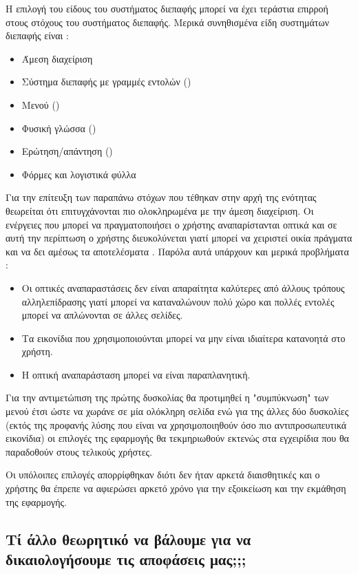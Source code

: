 \documentclass{assignment}
\begin{document}
Η επιλογή του είδους του συστήματος διεπαφής μπορεί να έχει τεράστια επιρροή στους στόχους του συστήματος διεπαφής. Μερικά συνηθισμένα είδη συστημάτων διεπαφής είναι \cite{class_notes}:

\begin{itemize}
\item Άμεση διαχείριση
\item Σύστημα διεπαφής με γραμμές εντολών ()
\item Μενού ()
\item Φυσική γλώσσα ()
\item Ερώτηση/απάντηση ()
\item Φόρμες και λογιστικά φύλλα
\end{itemize}

Για την επίτευξη των παραπάνω στόχων που τέθηκαν στην αρχή της ενότητας θεωρείται ότι επιτυγχάνονται πιο ολοκληρωμένα με την άμεση διαχείριση. Οι ενέργειες που μπορεί να πραγματοποιήσει ο χρήστης αναπαρίστανται οπτικά και σε αυτή την περίπτωση ο χρήστης διευκολύνεται γιατί μπορεί να χειριστεί οικία πράγματα και να δει αμέσως τα αποτελέσματα \cite{class_notes}. Παρόλα αυτά υπάρχουν και μερικά προβλήματα \cite{class_notes}:

\begin{itemize}
\item Οι οπτικές αναπαραστάσεις δεν είναι απαραίτητα καλύτερες από άλλους τρόπους αλληλεπίδρασης γιατί μπορεί να καταναλώνουν πολύ χώρο και πολλές εντολές μπορεί να απλώνονται σε άλλες σελίδες.
\item Τα εικονίδια που χρησιμοποιούνται μπορεί να μην είναι ιδιαίτερα κατανοητά στο χρήστη.
\item Η οπτική αναπαράσταση μπορεί να είναι παραπλανητική.
\end{itemize}

Για την αντιμετώπιση της πρώτης δυσκολίας θα προτιμηθεί η "συμπύκνωση" των μενού έτσι ώστε να χωράνε σε μία ολόκληρη σελίδα ενώ για της άλλες δύο δυσκολίες (εκτός της προφανής λύσης που είναι να χρησιμοποιηθούν όσο πιο αντιπροσωπευτικά εικονίδια) οι επιλογές της εφαρμογής θα τεκμηριωθούν εκτενώς στα εγχειρίδια που θα παραδοθούν στους τελικούς χρήστες.

Οι υπόλοιπες επιλογές απορρίφθηκαν διότι δεν ήταν αρκετά διαισθητικές και ο χρήστης θα έπρεπε να αφιερώσει αρκετό χρόνο για την εξοικείωση και την εκμάθηση της εφαρμογής.

\subsection{Τί άλλο θεωρητικό να βάλουμε για να δικαιολογήσουμε τις αποφάσεις μας;;;}
\end{document}
